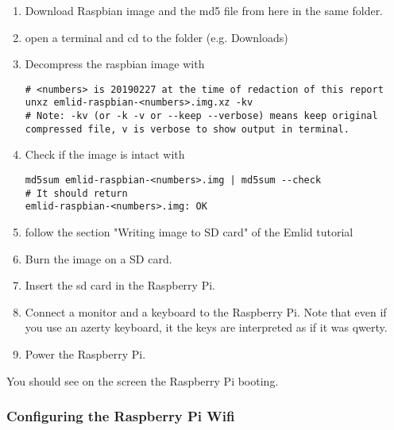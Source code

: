                 \begin{enumerate}
                    \item Download Raspbian image and the md5 file from here \cite{emlid_rpi_config} in the same folder.
                    \item open a terminal and cd to the folder (e.g. Downloads)
                    \item Decompress the raspbian image with
                    
                    \begin{verbatim}
# <numbers> is 20190227 at the time of redaction of this report
unxz emlid-raspbian-<numbers>.img.xz -kv
# Note: -kv (or -k -v or --keep --verbose) means keep original compressed file, v is verbose to show output in terminal.
                    \end{verbatim}
                
                    \item Check if the image is intact with

                    \begin{verbatim}
md5sum emlid-raspbian-<numbers>.img | md5sum --check
# It should return
emlid-raspbian-<numbers>.img: OK
                    \end{verbatim}
                
                    \item follow the section "Writing image to SD card" of the Emlid tutorial
                    \item Burn the image on a SD card.
                    \item Insert the sd card in the Raspberry Pi.
                    \item Connect a monitor and a keyboard to the Raspberry Pi. Note that even if you use an azerty keyboard, it the keys are interpreted as if it was qwerty.
                    \item Power the Raspberry Pi.
                \end{enumerate}
                You should see on the screen the Raspberry Pi booting.
                
            \subsubsection{Configuring the Raspberry Pi Wifi}
                
